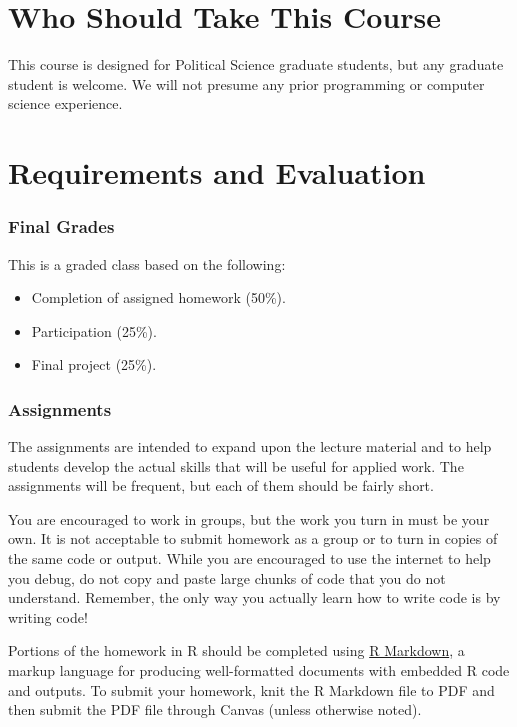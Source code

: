 \documentclass[]{book}
\providecommand{\tightlist}{%
  \setlength{\itemsep}{0pt}\setlength{\parskip}{0pt}}
\begin{document}
\section{Who Should Take This Course}\label{who-should-take-this-course}

This course is designed for Political Science graduate students, but any
graduate student is welcome. We will not presume any prior programming
or computer science experience.

\section{Requirements and Evaluation}\label{requirements-and-evaluation}

\subsubsection*{Final Grades}\label{final-grades}

This is a graded class based on the following:

\begin{itemize}
\tightlist
\item
  Completion of assigned homework (50\%).
\item
  Participation (25\%).
\item
  Final project (25\%).
\end{itemize}

\subsubsection*{Assignments}\label{assignments}

The assignments are intended to expand upon the lecture material and to
help students develop the actual skills that will be useful for applied
work. The assignments will be frequent, but each of them should be
fairly short.

You are encouraged to work in groups, but the work you turn in must be
your own. It is not acceptable to submit homework as a group or to turn
in copies of the same code or output. While you are encouraged to use
the internet to help you debug, do not copy and paste large chunks of
code that you do not understand. Remember, the only way you actually
learn how to write code is by writing code!

Portions of the homework in R should be completed using
\href{https://rmarkdown.rstudio.com/}{R Markdown}, a markup language for
producing well-formatted documents with embedded R code and outputs. To
submit your homework, knit the R Markdown file to PDF and then submit
the PDF file through Canvas (unless otherwise noted).
\end{document}
